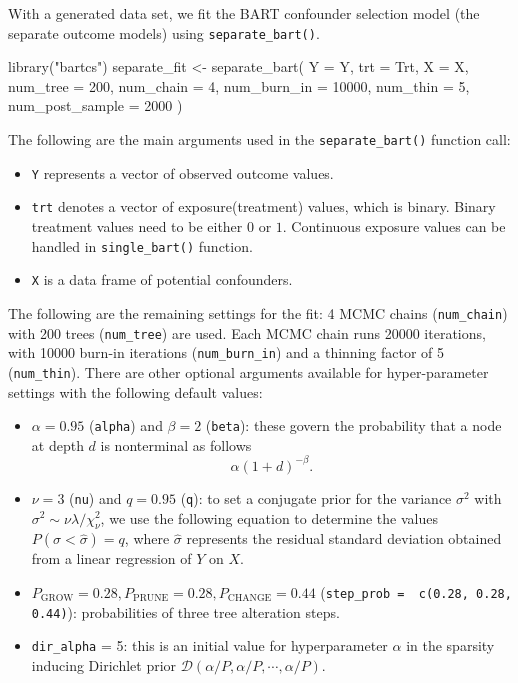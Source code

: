 With a generated data set, we fit the BART confounder selection model (the separate outcome models) using \verb|separate_bart()|.
\begin{example}
library("bartcs")
separate_fit <- separate_bart(
     Y = Y, trt = Trt, X = X, num_tree = 200, num_chain = 4,
     num_burn_in = 10000, num_thin = 5, num_post_sample = 2000
   )
\end{example}
The following are the main arguments used in the \verb|separate_bart()| function call:
\begin{itemize}
\item \verb|Y| represents a vector of observed outcome values.
\item \verb|trt| denotes a vector of exposure(treatment) values, which is binary. Binary treatment values need to be either $0$ or $1$. Continuous exposure values can be handled in  \verb|single_bart()| function.
\item \verb|X| is a data frame of potential confounders.
\end{itemize}
The following are the remaining settings for the fit: 4 MCMC chains (\verb|num_chain|) with 200 trees (\verb|num_tree|) are used. Each MCMC chain runs 20000 iterations, with 10000 burn-in iterations (\verb|num_burn_in|) and a thinning factor of 5 (\verb|num_thin|). There are other optional arguments available for hyper-parameter settings with the following default values:
\begin{itemize}
\item $\alpha=0.95$ (\verb|alpha|) and $\beta=2$ (\verb|beta|): these govern the probability that a node at depth $d$ is nonterminal as follows
\[\alpha(1+d)^{-\beta}.\]
\item $\nu=3$ (\verb|nu|) and $q = 0.95$ (\verb|q|): to set a conjugate prior for the variance $\sigma^2$ with $\sigma^2 \sim \nu \lambda / \chi_\nu^2$, we use the following equation to determine the values $P(\sigma < \hat{\sigma}) = q$, where $\hat{\sigma}$ represents the residual standard deviation obtained from a linear regression of $Y$ on $X$.
\item $P_\text{GROW}=0.28, P_\text{PRUNE}=0.28, P_\text{CHANGE}=0.44$ (\verb|step_prob =  c(0.28, 0.28, 0.44)|): probabilities of three  tree alteration steps.
\item \verb|dir_alpha| = 5: this is an initial value for hyperparameter $\alpha$ in the sparsity inducing Dirichlet prior $\mathcal{D}(\alpha/P, \alpha/P, \cdots, \alpha/P)$.
\end{itemize}

